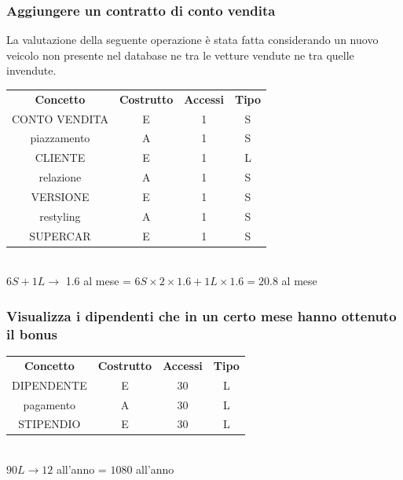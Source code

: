 \documentclass[11pt]{article}
\begin{document}
\subsubsection{Aggiungere un contratto di conto vendita}

La valutazione della seguente operazione è stata fatta considerando un nuovo
veicolo non presente nel database ne tra le vetture vendute ne tra quelle
invendute.

\begin{table}[H]
    \centering
    \begin{tabular}{ c c c c } 
        \rowcolor{red!20!}
        \textbf{Concetto} & \textbf{Costrutto} & \textbf{Accessi} &
        \textbf{Tipo}\\ 
        CONTO VENDITA & E & 1 & S \\ 
        piazzamento & A & 1 & S \\
        CLIENTE & E & 1 & L \\ 
        relazione & A & 1 & S \\
        VERSIONE & E & 1 & S \\ 
        restyling & A & 1 & S \\
        SUPERCAR & E & 1 & S \\ 
    \end{tabular}\\
    \(6S + 1L \rightarrow \) 1.6 al mese = \( 6S \times 2 \times 1.6 + 1L \times
    1.6 = 20.8 \) al mese  
\end{table}

\subsubsection{Visualizza i dipendenti che in un certo mese hanno ottenuto il
bonus} 

\begin{table}[H]
    \centering
    \begin{tabular}{ c c c c } 
        \rowcolor{red!20!}
        \textbf{Concetto} & \textbf{Costrutto} & \textbf{Accessi} &
        \textbf{Tipo}\\ 
        DIPENDENTE & E & 30 & L \\ 
        pagamento & A & 30 & L \\
        STIPENDIO & E & 30 & L \\ 
    \end{tabular}\\
    \( 90L \rightarrow 12 \) all'anno = \( 1080 \) all'anno
\end{table}
\end{document}
